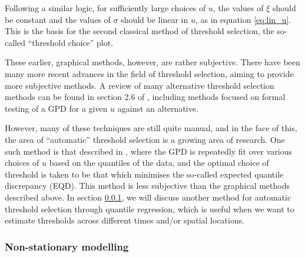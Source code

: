 \documentclass{article}
\numberwithin{equation}{section}
\begin{document}
Following a similar logic, for sufficiently large choices of $u$, the values of $\xi$ should be constant and the values of $\sigma$ should be linear in $u$, as in equation \eqref{eq:lin_u}.
This is the basis for the second classical method of threshold selection, the so-called ``threshold choice'' plot.

These earlier, graphical methods, however, are rather subjective.
There have been many more recent advances in the field of threshold selection, aiming to provide more subjective methods. 
A review of many alternative threshold selection methods can be found in section 2.6 of \citet{Belzile2022}, including methods focused on formal testing of a GPD for a given $u$ against an alternative. %

However, many of these techniques are still quite manual, and in the face of this, the area of ``automatic'' threshold selection is a growing area of research. 
One such method is that described in \citet{Murphy2024}, where the GPD is repeatedly fit over various choices of $u$ based on the quantiles of the data, and the optimal choice of threshold is taken to be that which minimises the so-called expected quantile discrepancy (EQD).
This method is less subjective than the graphical methods described above.
In section \ref{subsubsec:non_stationary}, we will discuss another method for automatic threshold selection through quantile regression, which is useful when we want to estimate thresholds across different times and/or spatial locations.

\subsubsection{Non-stationary modelling} \label{subsubsec:non_stationary}
\end{document}
